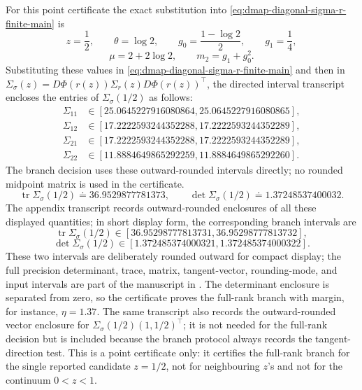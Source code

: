 \begin{remark}
For this point certificate the exact substitution into
\eqref{eq:dmap-diagonal-sigma-r-finite-main} is
\[
z=\frac12,\qquad
\theta=\log2,\qquad
g_0=\frac{1-\log2}{2},\qquad
g_1=\frac14,
\]
\[
\mu=2+2\log2,\qquad
m_2=g_1+g_0^2 .
\]
Substituting these values in \eqref{eq:dmap-diagonal-sigma-r-finite-main} and
then in
\(\Sigma_\sigma(z)=D\Phi(r(z))\Sigma_r(z)D\Phi(r(z))^\top\), the directed
interval transcript encloses the entries of \(\Sigma_\sigma(1/2)\) as follows:
\[
\begin{aligned}
\Sigma_{11}&\in[25.0645227916080864,25.0645227916080865],\\
\Sigma_{12}&\in[17.2222593244352288,17.2222593244352289],\\
\Sigma_{21}&\in[17.2222593244352288,17.2222593244352289],\\
\Sigma_{22}&\in[11.8884649865292259,11.8884649865292260].
\end{aligned}
\]
The branch decision uses these outward-rounded intervals directly; no rounded
midpoint matrix is used in the certificate.
\[
\operatorname{tr}\Sigma_\sigma(1/2)
\doteq 36.9529877781373,
\qquad
\det\Sigma_\sigma(1/2)
\doteq 1.37248537400032.
\]
The appendix transcript records outward-rounded enclosures of all these
displayed quantities; in short display form, the corresponding branch
intervals are
\[
\operatorname{tr}\Sigma_\sigma(1/2)
\in[36.95298777813731,36.95298777813732],
\]
\[
\det\Sigma_\sigma(1/2)
\in[1.372485374000321,1.372485374000322].
\]
These two intervals are deliberately rounded outward for compact display; the
full precision determinant, trace, matrix, tangent-vector, rounding-mode, and
input intervals are part of the manuscript in
.  The determinant
enclosure is separated from zero, so the certificate proves the full-rank
branch with margin, for instance, \(\eta=1.37\).  The same transcript
also records the outward-rounded vector enclosure for
\(\Sigma_\sigma(1/2)(1,1/2)^\top\); it is not needed for the full-rank
decision but is included because the branch protocol always records the
tangent-direction test.
This is a point certificate only: it certifies the full-rank branch for the
single reported candidate \(z=1/2\), not for neighbouring \(z\)'s and not for
the continuum \(0<z<1\).
\end{remark}

